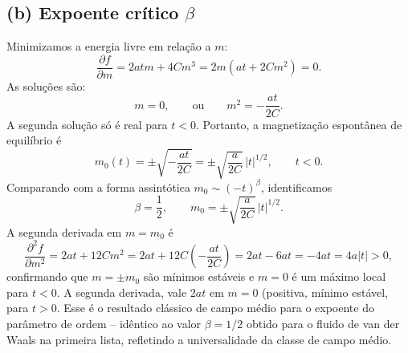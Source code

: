 \documentclass[11pt,a4paper]{article}
\begin{document}
\subsection*{(b) Expoente crítico $\beta$}
%
Minimizamos a energia livre em relação a $m$:
%
\begin{equation}
    \frac{\partial f}{\partial m} = 2a t m + 4 C m^3 = 2m (a t + 2 C m^2) = 0.
\end{equation}
%
As soluções são:
%
\begin{equation}
    m = 0, \qquad \text{ou} \qquad m^2 = -\frac{a t}{2C}.
\end{equation}
%
A segunda solução só é real para $t < 0$. Portanto, a magnetização espontânea de equilíbrio é
%
\begin{equation}
    m_0(t) = \pm \sqrt{-\frac{a t}{2C}} = \pm \sqrt{\frac{a}{2C}} \, |t|^{1/2}, \qquad t < 0.
\end{equation}
%
Comparando com a forma assintótica $m_0 \sim (-t)^\beta$, identificamos
%
\begin{equation}
    \boxed{\beta = \frac{1}{2}, \qquad m_0 = \pm \sqrt{\frac{a}{2C}} \, |t|^{1/2}}.
\end{equation}
%
A segunda derivada em $m = m_0$ é
%
\begin{equation}
    \frac{\partial^2 f}{\partial m^2} = 2a t + 12 C m^2 = 2a t + 12 C \left( -\frac{a t}{2C} \right) = 2a t - 6a t = -4a t = 4a |t| > 0,
\end{equation}
%
confirmando que $m = \pm m_0$ são mínimos estáveis e $m=0$ é um máximo local para $t<0$. A segunda derivada, vale $2at$ em $m=0$ (positiva, mínimo estável, para $t>0$. Esse é o resultado clássico de campo médio para o expoente do parâmetro de ordem -- idêntico ao valor $\beta=1/2$ obtido para o fluido de van der Waals na primeira lista, refletindo a universalidade da classe de campo médio.
%
\end{document}
